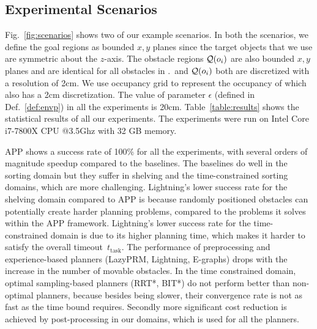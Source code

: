 \documentclass[a4paper]{report}
\begin{document}
\subsection{Experimental Scenarios}
Fig.~\ref{fig:scenarios} shows two of our example scenarios. In both the scenarios, we define the goal regions \calG as bounded $x,y$ planes since the target objects that we use are symmetric about the $z$-axis. The obstacle regions $\mathcal{Q}(o_i)$ are also bounded $x,y$ planes and are identical for all obstacles in \calO.~\calG and $\mathcal{Q}(o_i)$ both are discretized with a resolution of 2cm. We use occupancy grid to represent the occupancy of \calW which also has a 2cm discretization. The value of parameter $\epsilon$ (defined in Def.~\ref{def:envp}) in all the experiments is 20cm.
%
%
Table~\ref{table:results} shows the statistical results of all our experiments. The experiments were run on Intel Core i7-7800X CPU @3.5Ghz with 32 GB memory.

APP shows a success rate of 100\% for all the experiments, with several orders of magnitude speedup compared to the baselines. The baselines do well in the sorting domain but they suffer in shelving and the time-constrained sorting domains, which are more challenging.
%
Lightning's lower success rate for the shelving domain compared to APP is because randomly positioned obstacles can potentially create harder planning problems, compared to the problems it solves within the APP framework.
%
Lightning's lower success rate for the time-constrained domain is due to its higher planning time, which makes it harder to satisfy the overall timeout~$t_\textrm{task}$.
%
%
The performance of preprocessing and experience-based planners (LazyPRM, Lightning, E-graphs) drops with the increase in the number of movable obstacles.
%
In the time constrained domain, optimal sampling-based planners (RRT*, BIT*) do not perform better than non-optimal planners, because besides being slower, their convergence rate is not as fast as the time bound requires. Secondly more significant cost reduction is achieved by post-processing in our domains, which is used for all the planners.
\end{document}
